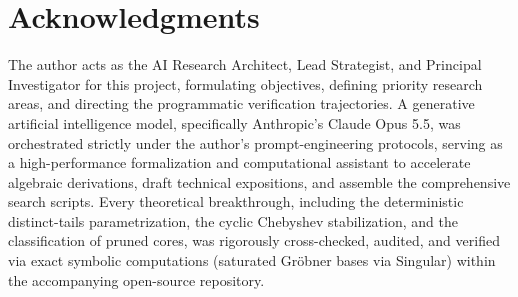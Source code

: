 




















\section*{Acknowledgments}
The author acts as the AI Research Architect, Lead Strategist, and Principal Investigator for this project, formulating objectives, defining priority research areas, and directing the programmatic verification trajectories. A generative artificial intelligence model, specifically Anthropic's Claude Opus 5.5, was orchestrated strictly under the author's prompt-engineering protocols, serving as a high-performance formalization and computational assistant to accelerate algebraic derivations, draft technical expositions, and assemble the comprehensive search scripts. Every theoretical breakthrough, including the deterministic distinct-tails parametrization, the cyclic Chebyshev stabilization, and the classification of pruned cores, was rigorously cross-checked, audited, and verified via exact symbolic computations (saturated Gr{\"o}bner bases via Singular) within the accompanying  open-source repository.



